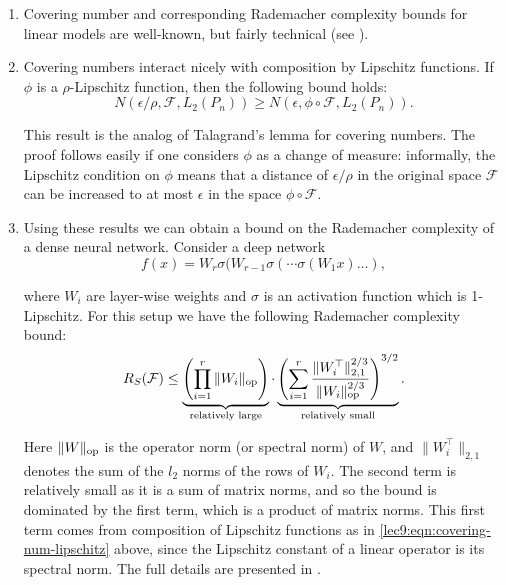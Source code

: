 \begin{enumerate}
\item Covering number and corresponding Rademacher complexity bounds for linear models are well-known, but fairly technical (see \cite{zhang2002}).
    
\item Covering numbers interact nicely with composition by Lipschitz functions. If $\phi$ is a $\rho$-Lipschitz function, then the following bound holds:
\begin{equation}\label{lec9:eqn:covering-num-lipschitz}
N(\epsilon/\rho, \mathcal{F}, L_2({P_n}))\geq N(\epsilon, \phi\circ\mathcal{F}, L_2({P_n})).
\end{equation}
    
This result is the analog of Talagrand's lemma for covering numbers. The proof follows easily if one considers $\phi$ as a change of measure: informally, the Lipschitz condition on $\phi$ means that a distance of $\epsilon/\rho$ in the original space $\mathcal{F}$ can be increased to at most $\epsilon$ in the space $\phi \circ \mathcal{F}$.

\item Using these results we can obtain a bound on the Rademacher complexity of a dense neural network. Consider a deep network
\begin{equation}
f(x) = W_r\sigma(W_{r-1}\sigma(\cdots \sigma(W_1x)\ldots),
\end{equation}

where $W_i$ are layer-wise weights and $\sigma$ is an activation function which is 1-Lipschitz. For this setup we have the following Rademacher complexity bound:
\begin{equation}
R_S (\mathcal F) \leq \underbrace{\left(\prod_{i=1}^r\|W_i\|_{\textup{op}} \right)}_{\text{relatively large}} \cdot \underbrace{\left( \sum_{i=1}^r\frac{\|W_i^\top\|^{2/3}_{2,1}}{\|W_i\|_{\textup{op}}^{2/3}}\right)^{3/2}}_{\text{relatively small}}.
\end{equation}
        
Here $\|W\|_{\textup{op}}$ is the operator norm (or spectral norm) of $W$, and $\|W_i^\top\|_{2,1}$ denotes the sum of the $l_2$ norms of the rows of $W_i$. The second term is relatively small as it is a sum of matrix norms, and so the bound is dominated by the first term, which is a product of matrix norms. This first term comes from composition of Lipschitz functions as in \eqref{lec9:eqn:covering-num-lipschitz} above, since the Lipschitz constant of a linear operator is its spectral norm. The full details are presented in \cite{bartlett2017}.
\end{enumerate}



